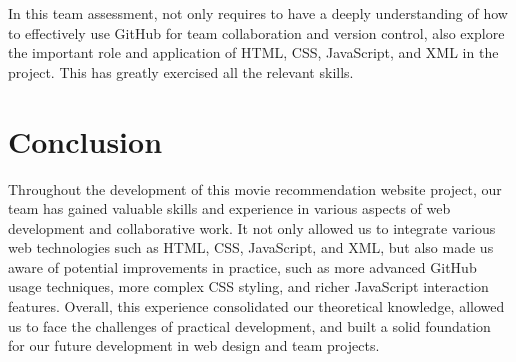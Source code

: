 \documentclass{article}
\begin{document}
In this team assessment, not only requires to have a deeply understanding of how to effectively use GitHub for team collaboration and version control,  also explore the important role and application of HTML, CSS, JavaScript, and XML in the project. This has greatly exercised all the relevant skills.

    
\section{Conclusion}

Throughout the development of this movie recommendation website project, our team has gained valuable skills and experience in various aspects of web development and collaborative work. It not only allowed us to integrate various web technologies such as HTML, CSS, JavaScript, and XML, but also made us aware of potential improvements in practice, such as more advanced GitHub usage techniques, more complex CSS styling, and richer JavaScript interaction features. Overall, this experience consolidated our theoretical knowledge, allowed us to face the challenges of practical development, and built a solid foundation for our future development in web design and team projects.
\end{document}
